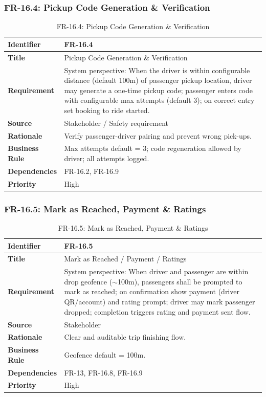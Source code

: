 \subsubsection{FR-16.4: Pickup Code Generation \& Verification}

\begin{longtable}{|p{3cm}|p{12cm}|}
\caption{FR-16.4: Pickup Code Generation \& Verification}
\label{tab:fr-16-4} \\
\hline
\rowcolor{lightgray!30}
\textbf{Identifier} & FR-16.4 \\
\hline
\textbf{Title} & Pickup Code Generation \& Verification \\
\hline
\textbf{Requirement} & System perspective: When the driver is within configurable distance (default 100m) of passenger pickup location, driver may generate a one-time pickup code; passenger enters code with configurable max attempts (default 3); on correct entry set booking to ride started. \\
\hline
\textbf{Source} & Stakeholder / Safety requirement \\
\hline
\textbf{Rationale} & Verify passenger-driver pairing and prevent wrong pick-ups. \\
\hline
\textbf{Business Rule} & Max attempts default = 3; code regeneration allowed by driver; all attempts logged. \\
\hline
\textbf{Dependencies} & FR-16.2, FR-16.9 \\
\hline
\textbf{Priority} & High \\
\hline
\end{longtable}

\subsubsection{FR-16.5: Mark as Reached, Payment \& Ratings}

\begin{longtable}{|p{3cm}|p{12cm}|}
\caption{FR-16.5: Mark as Reached, Payment \& Ratings}
\label{tab:fr-16-5} \\
\hline
\rowcolor{lightgray!30}
\textbf{Identifier} & FR-16.5 \\
\hline
\textbf{Title} & Mark as Reached / Payment / Ratings \\
\hline
\textbf{Requirement} & System perspective: When driver and passenger are within drop geofence ($\sim$100m), passengers shall be prompted to mark as reached; on confirmation show payment (driver QR/account) and rating prompt; driver may mark passenger dropped; completion triggers rating and payment sent flow. \\
\hline
\textbf{Source} & Stakeholder \\
\hline
\textbf{Rationale} & Clear and auditable trip finishing flow. \\
\hline
\textbf{Business Rule} & Geofence default = 100m. \\
\hline
\textbf{Dependencies} & FR-13, FR-16.8, FR-16.9 \\
\hline
\textbf{Priority} & High \\
\hline
\end{longtable}

